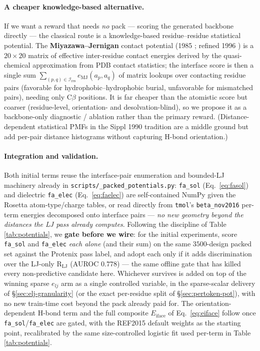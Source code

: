 \documentclass[11pt]{article}
\newcommand{\R}{\mathrm{R}}
\newcommand{\ttk}[1]{\texttt{\small #1}}
\begin{document}
\paragraph{A cheaper knowledge-based alternative.} If we want a reward that needs \emph{no} pack ---
scoring the generated backbone directly --- the classical route is a knowledge-based residue--residue
statistical potential. The \textbf{Miyazawa--Jernigan} contact potential (1985 \cite{mj1985}; refined
1996 \cite{mj1996}) is a $20{\times}20$ matrix of effective inter-residue contact energies derived by
the quasi-chemical approximation from PDB contact statistics; the interface score is then a single
sum $\sum_{(p,q)\in\mathcal I_{\mathrm{res}}} e_{\mathrm{MJ}}(a_p,a_q)$ of matrix lookups over
contacting residue pairs (favorable for hydrophobic--hydrophobic burial, unfavorable for mismatched
pairs), needing only C$\beta$ positions. It is far cheaper than the atomistic score but coarser
(residue-level, orientation- and desolvation-blind), so we propose it as a backbone-only diagnostic /
ablation rather than the primary reward. (Distance-dependent statistical PMFs in the Sippl 1990
tradition are a middle ground but add per-pair distance histograms without capturing H-bond
orientation.)

\paragraph{Integration and validation.} Both initial terms reuse the interface-pair enumeration and
bounded-LJ machinery already in \ttk{scripts/\_packed\_potentials.py}: \ttk{fa\_sol} (Eq.\
\ref{eq:fasol}) and dielectric \ttk{fa\_elec} (Eq.\ \ref{eq:faelec}) are self-contained NumPy given
the Rosetta atom-type/charge tables, or read directly from \ttk{tmol}'s \ttk{beta\_nov2016} per-term
energies decomposed onto interface pairs --- \emph{no new geometry beyond the distances the LJ pass
already computes}. Following the discipline of Table \ref{tab:potentials}, we \textbf{gate before we
wire}: for the initial experiments, score \ttk{fa\_sol} and \ttk{fa\_elec} \emph{each alone} (and
their sum) on the same $3500$-design packed set against the Protenix pass label, and adopt each only
if it adds discrimination over the LJ-only $\R_{\mathrm{LJ}}$ (AUROC $0.778$) --- the same offline
gate that has killed every non-predictive candidate here. Whichever survives is added on top of the
winning sparse $e_{lj}$ arm as a single controlled variable, in the sparse-scalar delivery of
\S\ref{sec:elj-granularity} (or the exact per-residue split of \S\ref{sec:pertoken-pot}), with no new
train-time cost beyond the pack already paid for. The orientation-dependent H-bond term and the full
composite $E_{\mathrm{iface}}$ of Eq.\ \ref{eq:eiface} follow once \ttk{fa\_sol}/\ttk{fa\_elec} are
gated, with the REF2015 default weights as the starting point, recalibrated by the same
size-controlled logistic fit used per-term in Table \ref{tab:potentials}.
\end{document}

